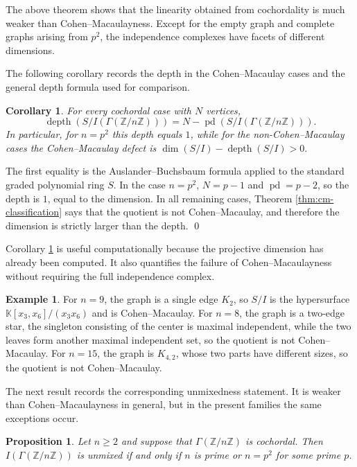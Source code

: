 \documentclass[12pt]{article}
\newtheorem{proposition}[theorem]{Proposition}
\newtheorem{corollary}[theorem]{Corollary}
\theoremstyle{definition}
\newtheorem{example}[theorem]{Example}
\renewenvironment{proof}{{\bf \noindent Proof.}}{\qed}
\begin{document}
The above theorem shows that the linearity obtained from cochordality is much weaker than Cohen--Macaulayness.  Except for the empty graph and complete graphs arising from $p^2$, the independence complexes have facets of different dimensions.

\medskip

\noindent The following corollary records the depth in the Cohen--Macaulay cases and the general depth formula used for comparison.
\begin{corollary}\label{cor:depth-defect}
For every cochordal case with $N$ vertices,
$$
\operatorname{depth}(S/I(\Gamma(\mathbb{Z}/n\mathbb{Z})))=N-\operatorname{pd}(S/I(\Gamma(\mathbb{Z}/n\mathbb{Z}))).
$$
In particular, for $n=p^2$ this depth equals $1$, while for the non-Cohen--Macaulay cases the Cohen--Macaulay defect is
$ \dim(S/I)-\operatorname{depth}(S/I)>0. $
\end{corollary}

\begin{proof}
The first equality is the Auslander--Buchsbaum formula applied to the standard graded polynomial ring $S$.  In the case $n=p^2$, $N=p-1$ and $\operatorname{pd}=p-2$, so the depth is $1$, equal to the dimension.  In all remaining cases, Theorem \ref{thm:cm-classification} says that the quotient is not Cohen--Macaulay, and therefore the dimension is strictly larger than the depth.
\end{proof}

\medskip

Corollary \ref{cor:depth-defect} is useful computationally because the projective dimension has already been computed.  It also quantifies the failure of Cohen--Macaulayness without requiring the full independence complex.



\medskip

\begin{example}\label{ex:cm-checks}
For $n=9$, the graph is a single edge $K_2$, so $S/I$ is the hypersurface $\mathbb{K}[x_3,x_6]/(x_3x_6)$ and is Cohen--Macaulay.  For $n=8$, the graph is a two-edge star, the singleton consisting of the center is maximal independent, while the two leaves form another maximal independent set, so the quotient is not Cohen--Macaulay.  For $n=15$, the graph is $K_{4,2}$, whose two parts have different sizes, so the quotient is not Cohen--Macaulay.
\end{example}


\medskip

\noindent The next result records the corresponding unmixedness statement.  It is weaker than Cohen--Macaulayness in general, but in the present families the same exceptions occur.
\begin{proposition}\label{prop:unmixed-classification}
Let $n\geq2$ and suppose that $\Gamma(\mathbb{Z}/n\mathbb{Z})$ is cochordal.  Then $I(\Gamma(\mathbb{Z}/n\mathbb{Z}))$ is unmixed if and only if $n$ is prime or $n=p^2$ for some prime $p$.
\end{proposition}
\end{document}

